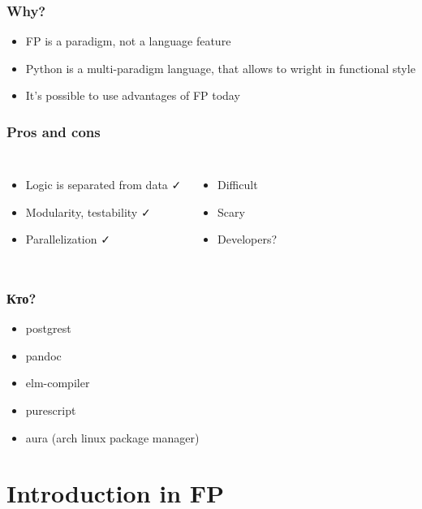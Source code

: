 \documentclass[18pt, compress, aspectratio=169]{beamer}
\def\check{\textcolor{check}{\FA \faCheck}}
\def\fail{\textcolor{fail}{\FA \faRemove}}
\begin{document}
\begin{frame}[fragile]
    \frametitle{Why?}
    \begin{itemize}[label={\MVRightarrow}]
        \item FP is a paradigm, not a language feature
        \item Python is a multi-paradigm language, that allows to wright in functional style
        \item It's possible to use advantages of FP today
    \end{itemize}
\end{frame}

\begin{frame}
    \frametitle{Pros and cons}
    \vspace{-20pt}
    \begin{columns}[T,onlytextwidth]
        \begin{itemize}[label={\MVRightarrow}]
            \item <+->Logic is separated from data \check
            \item <+->Modularity, testability \check
            \item <+->Parallelization \check
        \end{itemize}

        \begin{itemize}[label={\MVRightarrow}]
            \item <+->Difficult \fail
            \item <+->Scary \fail
            \item <+->Developers? \fail
        \end{itemize}
    \end{columns}
\end{frame}

\begin{frame}[fragile]
    \frametitle{Кто?}
    \begin{itemize}[label={\MVRightarrow}]
        \item postgrest
        \item pandoc
        \item elm-compiler
        \item purescript
        \item aura (arch linux package manager)
    \end{itemize}
\end{frame}

\section{Introduction in FP}
\end{document}
